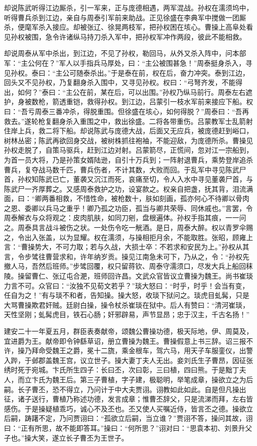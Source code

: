 却说陈武听得江边厮杀，引一军来，正与庞德相遇，两军混战。孙权在濡须坞中，听得曹兵杀到江边，亲自与周泰引军前来助战。正见徐盛在李典军中搅做一团厮杀，便麾军杀入接应。却被张辽、徐晃两枝军，把孙权困在垓心。曹操上高阜处看见孙权被围，急令许诸纵马持刀杀入军中，把孙权军冲作两段，彼此不能相救。

却说周泰从军中杀出，到江边，不见了孙权，勒回马，从外又杀入阵中，问本部军：“主公何在？”军人以手指兵马厚处，曰：“主公被围甚急！”周泰挺身杀入，寻见孙权。泰曰：“主公可随泰杀出。”于是泰在前，权在后，奋力冲突。泰到江边，回头又不见孙权，乃复翻身杀入围中，又寻见孙权。权曰：“弓弩齐发，不能得出，如何？”泰曰：“主公在前，某在后，可以出围。”孙权乃纵马前行。周泰左右遮护，身被数枪，箭透重铠，救得孙权。到江边，吕蒙引一枝水军前来接应下船。权曰：“吾亏周泰三番冲杀，得脱重围。但徐盛在垓心，如何得脱？”周泰曰：“吾再救去。”遂轮枪复翻身杀入重围之中，救出徐盛。二将各带重伤。吕蒙教军士乱箭射住岸上兵，救二将下船。却说陈武与庞德大战，后面又无应兵，被庞德赶到峪口，树林丛密；陈武再欲回身交战，被树株抓往袍袖，不能迎敌，为庞德所杀。曹操见孙权走脱了，自策马驱兵，赶到江边对射。吕蒙箭尽，正慌间，忽对江一宗船到，为首一员大将，乃是孙策女婿陆逊，自引十万兵到；一阵射退曹兵，乘势登岸追杀曹兵，复夺战马数千匹，曹兵伤者，不计其数，大败而回。于乱军中寻见陈武尸首，孙权知陈武已亡，董袭又沉江而死，哀痛至切，令人入水中寻见董袭尸首，与陈武尸一齐厚葬之。又感周泰救护之功，设宴款之。权亲自把盏，抚其背，泪流满面，曰：“卿两番相救，不惜性命，被枪数十，肤如刻画，孤亦何心不待卿以骨肉之恩、委卿以兵马之重乎！卿乃孤之功臣，孤当与卿共荣辱、同休戚也。”言罢，令周泰解衣与众将观之：皮肉肌肤，如同刀剜，盘根遍体。孙权手指其痕，一一问之。周泰具言战斗被伤之状。一处伤令吃一觥酒。是日，周泰大醉。权以青罗伞赐之，令出入张盖，以为显耀。权在濡须，与操相拒月余，不能取胜。张昭，顾雍上言：“曹操势大，不可力取；若与久战，大损士卒：不若求和安民为上。”孙权从其言，令步骘往曹营求和，许年纳岁贡。操见江南急未可下，乃从之，令：“孙权先撤人马，吾然后班师。”步骘回覆，权只留蒋钦、周泰守濡须口，尽发大兵上船回秣陵。操留曹仁、张辽屯合淝，班师回许昌。文武众官皆议立曹操为魏王。尚书崔琰力言不可。众官曰：“汝独不见荀文若乎？”琰大怒曰：“时乎，时乎！会当有变，任自为之！”有与琰不和者，告知操。操大怒，收琰下狱问之。琰虎目虬髯，只是大骂曹操欺君奸贼。廷尉白操，操令杖杀崔琰在狱中。后人有赞曰：“清河崔琰，天性坚刚；虬髯虎目，铁石心肠；奸邪辟易，声节显昂；忠于汉主，千古名扬！”

建安二十一年夏五月，群臣表奏献帝，颂魏公曹操功德，极天际地，伊、周莫及，宜进爵为王。献帝即令钟繇草诏，册立曹操为魏王。曹操假意上书三辞。诏三报不许，操乃拜命受魏王之爵，冕十二旒，乘金根车，驾六马，用天子车服銮仪，出警入跸，于邺郡盖魏王宫，议立世子。操大妻丁夫人无出。妾刘氏生子曹昂，因征张绣时死于宛城。卞氏所生四子：长曰丕，次曰彰，三曰植，四曰熊。于是黜丁夫人，而立卞氏为魏王后。第三子曹植，字子建，极聪明，举笔成章，操欲立之为后嗣。长子曹丕，恐不得立，乃问计于中大夫贾诩。诩教如此如此。自是但凡操出征，诸子送行，曹植乃称述功德，发言成章；惟曹丕辞父，只是流涕而拜，左右皆感伤。于是操疑植乖巧，诚心不及丕也。丕又使人买嘱近侍，皆言丕之德。操欲立后嗣，踌躇不定，乃问贾诩曰：“孤欲立后嗣，当立谁？”贾诩不答，操问其故，诩曰：“正有所思，故不能即答耳。”操曰：“何所思？”诩对曰：“思袁本初、刘景升父子也。”操大笑，遂立长子曹丕为王世子。

